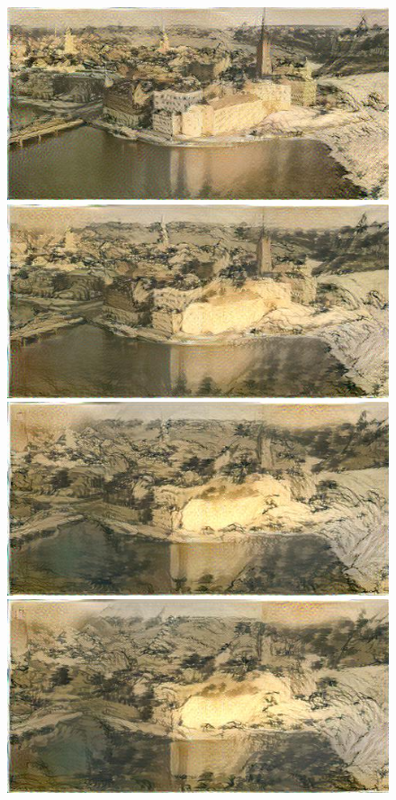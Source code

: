 \documentclass[runningheads]{llncs}
\begin{document}
\begin{figure}[h]
{\begin{minipage}[b]{0.15\textwidth}
\includegraphics[width=1.1\textwidth]{neural_style_transfer/img/fu_stockholm_output/fu_stockholm_conv4-2_1e-1.jpg} \\
\includegraphics[width=1.1\textwidth]{neural_style_transfer/img/fu_stockholm_output/fu_stockholm_conv4-2_1e-2.jpg} \\
\includegraphics[width=1.1\textwidth]{neural_style_transfer/img/fu_stockholm_output/fu_stockholm_conv4-2_1e-3.jpg} \\
\includegraphics[width=1.1\textwidth]{neural_style_transfer/img/fu_stockholm_output/fu_stockholm_conv4-2_1e-4.jpg}

\end{minipage}}
\end{figure}
\end{document}
